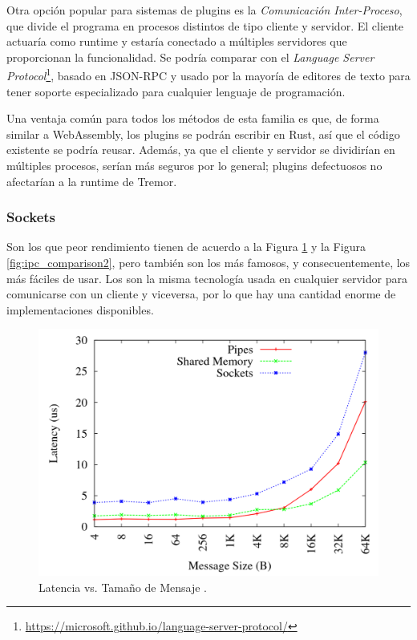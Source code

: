 Otra opción popular para sistemas de plugins es la \emph{Comunicación
Inter-Proceso}, que divide el programa en procesos distintos de tipo cliente y
servidor. El cliente actuaría como runtime y estaría conectado a múltiples
servidores que proporcionan la funcionalidad. Se podría comparar con el
\emph{Language Server
Protocol}\footnote{\url{https://microsoft.github.io/language-server-protocol/}},
basado en JSON-RPC y usado por la mayoría de editores de texto para tener
soporte especializado para cualquier lenguaje de programación.

Una ventaja común para todos los métodos de esta familia es que, de forma
similar a WebAssembly, los plugins se podrán escribir en Rust, así que el código
existente se podría reusar. Además, ya que el cliente y servidor se dividirían
en múltiples procesos, serían más seguros por lo general; plugins defectuosos no
afectarían a la runtime de Tremor.

\subsubsection{Sockets}

Son los que peor rendimiento tienen de acuerdo a la Figura
\ref{fig:ipc_comparison1} y la Figura \ref{fig:ipc_comparison2}, pero también
son los más famosos, y consecuentemente, los más fáciles de usar. Los \sockets
son la misma tecnología usada en cualquier servidor para comunicarse con un
cliente y viceversa, por lo que hay una cantidad enorme de implementaciones
disponibles.

\begin{figure}
    \centering
    \includegraphics[width=12cm]{./Imagenes/venkataraman2015evaluation1.png}
    \caption{Latencia vs. Tamaño de Mensaje \cite{venkataraman2015evaluation}.}%
    \label{fig:ipc_comparison1}
\end{figure}

